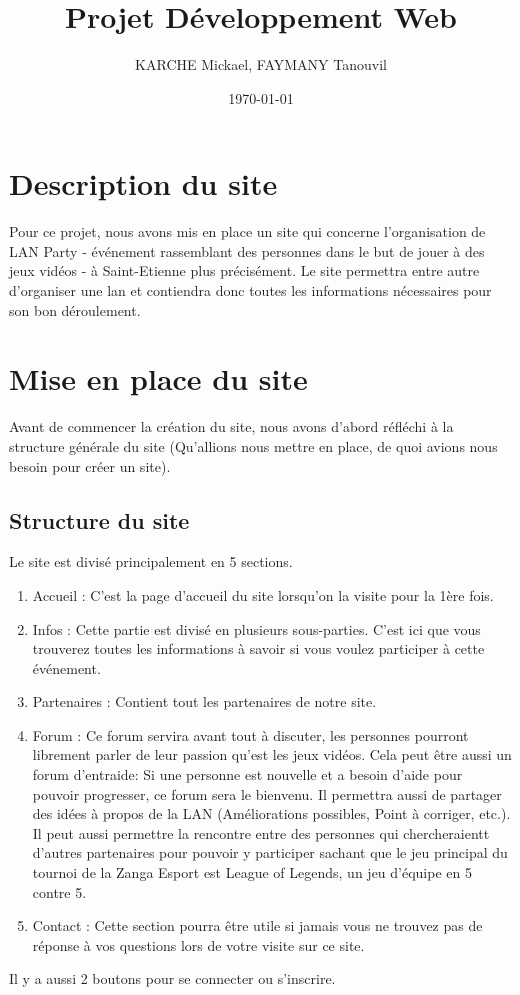 \documentclass[a4paper, 11pt]{article}
\title{Projet Développement Web}
\author{KARCHE Mickael, FAYMANY Tanouvil}
\date{\today}
\begin{document}
\maketitle

\newpage

\tableofcontents

\newpage

\section{Description du site}
Pour ce projet, nous avons mis en place un site qui concerne l'organisation de LAN Party - événement rassemblant des personnes dans le but de jouer à des jeux vidéos - à Saint-Etienne plus précisément.
Le site permettra entre autre d'organiser une lan et contiendra donc toutes les informations nécessaires pour son bon déroulement.


\section{Mise en place du site}
Avant de commencer la création du site, nous avons d'abord réfléchi à la structure générale du site (Qu'allions nous mettre en place, de quoi avions nous besoin pour créer un site).

\subsection{Structure du site}
Le site est divisé principalement en 5 sections.
\begin{enumerate}
\item Accueil : C'est la page d'accueil du site lorsqu'on la visite pour la 1ère fois.
\item Infos : Cette partie est divisé en plusieurs sous-parties. C'est ici que vous trouverez toutes les informations à savoir si vous voulez participer à cette événement.
\item Partenaires : Contient tout les partenaires de notre site.
\item Forum : Ce forum servira avant tout à discuter, les personnes pourront librement parler de leur passion qu'est les jeux vidéos.
  Cela peut être aussi un forum d'entraide: Si une personne est nouvelle et a besoin d'aide pour pouvoir progresser, ce forum sera le bienvenu.
  Il permettra aussi de partager des idées à propos de la LAN (Améliorations possibles, Point à corriger, etc.).
  Il peut aussi permettre la rencontre entre des personnes qui chercheraientt d'autres partenaires pour pouvoir y participer sachant que le jeu principal du tournoi de la Zanga Esport est League of Legends, un jeu d'équipe en 5 contre 5.
\item Contact : Cette section pourra être utile si jamais vous ne trouvez pas de réponse à vos questions lors de votre visite sur ce site.
\end{enumerate}
Il y a aussi 2 boutons pour se connecter ou s'inscrire.
\end{document}
